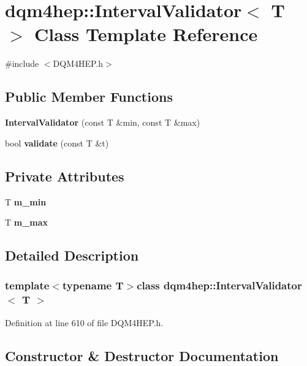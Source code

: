 \section{dqm4hep\+:\+:Interval\+Validator$<$ T $>$ Class Template Reference}
\label{classdqm4hep_1_1IntervalValidator}


{\ttfamily \#include $<$D\+Q\+M4\+H\+E\+P.\+h$>$}

\subsection*{Public Member Functions}
\begin{DoxyCompactItemize}
\item 
{\bf Interval\+Validator} (const T \&min, const T \&max)
\item 
bool {\bf validate} (const T \&t)
\end{DoxyCompactItemize}
\subsection*{Private Attributes}
\begin{DoxyCompactItemize}
\item 
T {\bf m\+\_\+min}
\item 
T {\bf m\+\_\+max}
\end{DoxyCompactItemize}


\subsection{Detailed Description}
\subsubsection*{template$<$typename T$>$class dqm4hep\+::\+Interval\+Validator$<$ T $>$}



Definition at line 610 of file D\+Q\+M4\+H\+E\+P.\+h.



\subsection{Constructor \& Destructor Documentation}
